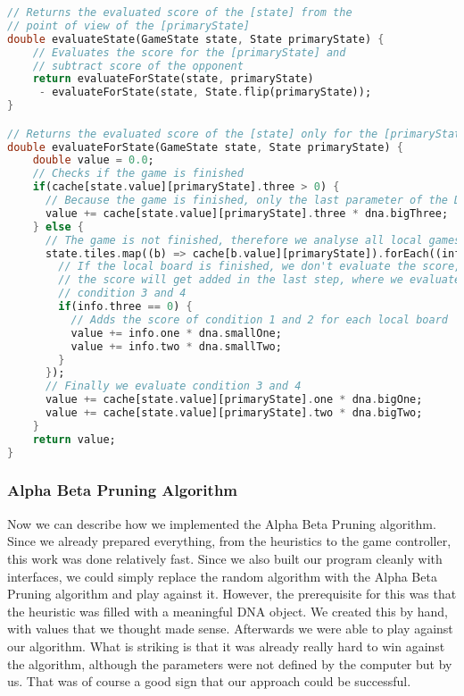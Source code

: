 \begin{lstlisting}[language=Dart,caption={Implementation of the evaluation}]
// Returns the evaluated score of the [state] from the
// point of view of the [primaryState]
double evaluateState(GameState state, State primaryState) {
	// Evaluates the score for the [primaryState] and
	// subtract score of the opponent
    return evaluateForState(state, primaryState)
     - evaluateForState(state, State.flip(primaryState));
}

// Returns the evaluated score of the [state] only for the [primaryState]
double evaluateForState(GameState state, State primaryState) {
    double value = 0.0;
    // Checks if the game is finished
    if(cache[state.value][primaryState].three > 0) {
      // Because the game is finished, only the last parameter of the DNA is relevant
      value += cache[state.value][primaryState].three * dna.bigThree;
    } else {
      // The game is not finished, therefore we analyse all local games
      state.tiles.map((b) => cache[b.value][primaryState]).forEach((info) {
        // If the local board is finished, we don't evaluate the score, because
        // the score will get added in the last step, where we evaluate
        // condition 3 and 4
        if(info.three == 0) {
       	  // Adds the score of condition 1 and 2 for each local board
          value += info.one * dna.smallOne;
          value += info.two * dna.smallTwo;
        }
      });
      // Finally we evaluate condition 3 and 4
      value += cache[state.value][primaryState].one * dna.bigOne;
      value += cache[state.value][primaryState].two * dna.bigTwo;
    }
    return value;
}
\end{lstlisting}

\subsubsection{Alpha Beta Pruning Algorithm}
Now we can describe how we implemented the Alpha Beta Pruning algorithm. Since we already prepared everything, from the heuristics to the game controller, this work was done relatively fast. Since we also built our program cleanly with interfaces, we could simply replace the random algorithm with the Alpha Beta Pruning algorithm and play against it. However, the prerequisite for this was that the heuristic was filled with a meaningful DNA object. We created this by hand, with values that we thought made sense. Afterwards we were able to play against our algorithm. What is striking is that it was already really hard to win against the algorithm, although the parameters were not defined by the computer but by us. That was of course a good sign that our approach could be successful.


